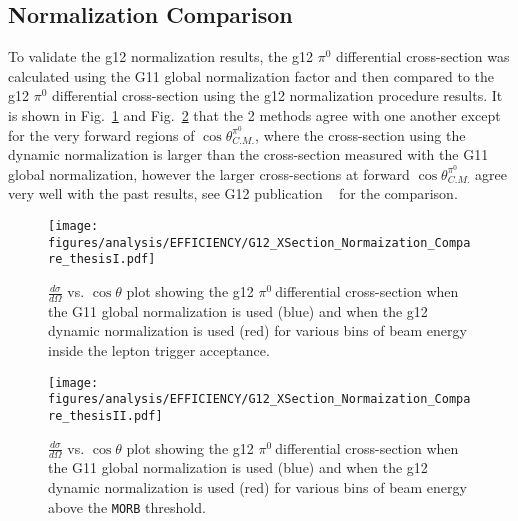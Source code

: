 \documentclass[11pt,a4paper]{article}
\newcommand{\abbr}[1]{\textsc{\texttt{#1}}}
\def\pizT{$\pi^{0} \ $}
\def\figures{/Users/michaelkunkel/WORK/GIT_HUB/THESIS/figures/print}
\newlength{\figwidth}
\newlength{\hfigheight}
\begin{document}
\subsection{Normalization Comparison}
To validate the g12 normalization results, the g12 $\pi^0$ differential cross-section was calculated using the G11 global normalization factor and then compared to the g12 $\pi^0$ differential cross-section using the g12 normalization procedure results. It is shown in Fig.~\ref{fig:toteff_compareI} and Fig.~\ref{fig:toteff_compareII} that the 2 methods agree with one another except for the very forward regions of $\cos\theta^{\pi^0}_{C.M.}$, where the cross-section using the dynamic normalization is larger than the cross-section measured with the G11 global normalization, however the larger cross-sections at forward $\cos\theta^{\pi^0}_{C.M.}$ agree very well with the past results, see G12 publication ~\cite{Kunkel} for the comparison.

\begin{figure}[h!]\begin{center}
    \texttt{[image: \\figures/analysis/EFFICIENCY/G12\_XSection\_Normaization\_Compare\_thesisI.pdf]}
    \caption[$\frac{d \sigma}{d \Omega}$ vs. $\cos \theta$ plot showing the g12 \pizT differential cross-section when the G11 global normalization is used (blue) and when the g12 dynamic normalization is used (red) for various bins of beam energy inside lepton trigger acceptance]{\label{fig:toteff_compareI} $\frac{d \sigma}{d \Omega}$ vs. $\cos \theta$ plot showing the g12 \pizT differential cross-section when the G11 global normalization is used (blue) and when the g12 dynamic normalization is used (red) for various bins of beam energy inside the lepton trigger acceptance.}
  \end{center}\end{figure}

\begin{figure}[h!]\begin{center}
    \texttt{[image: \\figures/analysis/EFFICIENCY/G12\_XSection\_Normaization\_Compare\_thesisII.pdf]}
    \caption[$\frac{d \sigma}{d \Omega}$ vs. $\cos \theta$ plot showing the g12 \pizT differential cross-section when the G11 global normalization is used (blue) and when the g12 dynamic normalization is used (red) for various bins of beam energy above \abbr{MORB} threshold]{\label{fig:toteff_compareII} $\frac{d \sigma}{d \Omega}$ vs. $\cos \theta$ plot showing the g12 \pizT differential cross-section when the G11 global normalization is used (blue) and when the g12 dynamic normalization is used (red) for various bins of beam energy above the \abbr{MORB} threshold.}
  \end{center}\end{figure}
\end{document}
